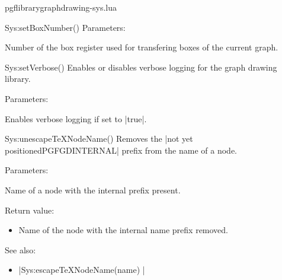 \begin{filedescription}{pgflibrarygraphdrawing-sys.lua}
\begin{luacommand}{{Sys:setBoxNumber}()}
Parameters:
\begin{parameterdescription}
	\item[\meta{boxregister}] Number of the box register used for transfering boxes of the current graph. 
\end{parameterdescription}



\end{luacommand}\begin{luacommand}{{Sys:setVerbose}()}
Enables or disables verbose logging for the graph drawing library. 

Parameters:
\begin{parameterdescription}
	\item[\meta{verbose}] Enables verbose logging if set to |true|. 
\end{parameterdescription}



\end{luacommand}\begin{luacommand}{{Sys:unescapeTeXNodeName}()}
Removes the |not yet positionedPGFGDINTERNAL| prefix from the name of a node. 

Parameters:
\begin{parameterdescription}
	\item[\meta{name}] Name of a node with the internal prefix present. 
\end{parameterdescription}


Return value:
\begin{itemize} \item[] Name of the node with the internal name prefix removed.  \end{itemize}


See also:
\begin{itemize}
	\item[] |Sys:escapeTeXNodeName(name) |
\end{itemize}

\end{luacommand}
\end{filedescription}